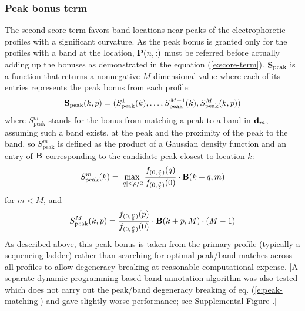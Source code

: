 \subsubsection{Peak bonus term}\label{sss:peak_bonus_term}
The second score term favors band locations near peaks of the electrophoretic profiles with a significant curvature. As the peak bonus is granted only for the profiles with a band at the location, ${\mathbf{P}}(n,:)$ must be referred before actually adding up the bonuses as demonstrated in the equation (\ref{e:score-term}).
$\bold{S}_{\textrm{peak}}$ is a function that returns a nonnegative $M$-dimensional value where each of its entries represents the peak bonus from each profile:
%
\begin{equation}
\bold{S}_{\textrm{peak}}(k,p) = (S^1_{\textrm{peak}}(k), \ldots, S^{M-1}_{\textrm{peak}}(k), S^M_{\textrm{peak}}(k,p))
\end{equation}
%
where $S^m_{\textrm{peak}}$ stands for the bonus from matching a peak to a band in ${\mathbf{d}}_m$, assuming such a band exists.  at the peak and the proximity of the peak to the band, so $S^m_{\textrm{peak}}$ is defined as the product of a Gaussian density function and an entry of ${\mathbf{B}}$ corresponding to the candidate peak closest to location $k$:
%
\begin{equation}
S^m_{\textrm{peak}}(k) = \max_{\substack{|q| < \rho/2}} {{f_{(0, {\rho \over 5})}(q)} \over {f_{(0, {\rho \over 5})}(0)}} \cdot {\mathbf{B}}(k+q, m)
\end{equation}
%
for $m < M$, and
%
\begin{equation}\label{e:peak-matching}
S^M_{\textrm{peak}}(k,p) = {{f_{(0, {\rho \over 5})}(p)} \over {f_{(0, {\rho \over 5})}(0)}} \cdot {\mathbf{B}}(k+p, {M}) \cdot (M-1)
\end{equation}
%
As described above, this peak bonus is taken from the primary profile (typically a sequencing ladder) rather than searching for optimal peak/band matches across all profiles to allow degeneracy breaking at reasonable computational expense.  [A separate dynamic-programming-based band annotation algorithm was also tested which does not carry out the peak/band degeneracy breaking of eq. (\ref{e:peak-matching}) and gave slightly worse performance; see Supplemental Figure .] 

